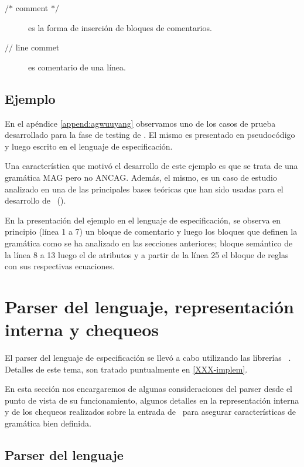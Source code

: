 \begin{description}
\item [$\textbf{/*}$ comment $\textbf{*/}$] es la forma de inserción de bloques de comentarios.
\item [$\textbf{//}$ line commet] es comentario de una línea.
\end{description} 

\subsection{Ejemplo}

En el apéndice \ref{append:agwuuyang} observamos uno de los casos de prueba desarrollado para la fase de testing de \maggen. El mismo es presentado en pseudocódigo y luego escrito en el lenguaje de especificación. 

Una característica que motivó el desarrollo de este ejemplo es que se trata de una gramática MAG pero no ANCAG. Además, el mismo, es un caso de estudio analizado en una de las principales bases teóricas que han sido usadas para el desarrollo de \maggen\ (\cite{wuu-yang1}). 

En la presentación del ejemplo en el lenguaje de especificación, se observa en principio (línea 1 a 7) un bloque de comentario y luego los bloques que definen la gramática como se ha analizado en las secciones anteriores; bloque semántico de la línea 8 a 13 luego el de atributos y a partir de la línea 25 el bloque de reglas con sus respectivas ecuaciones.

 
\section{Parser del lenguaje, representación interna y chequeos}

El parser del lenguaje de especificación se llevó a cabo utilizando las librerías \boost\ \spirit. Detalles de este tema, son tratado puntualmente en \ref{XXX-implem}. 

En esta sección nos encargaremos de algunas consideraciones del parser desde el punto de vista de su funcionamiento, algunos detalles en la representación interna y de los chequeos realizados sobre la entrada de \maggen\ para asegurar características de gramática bien definida.

\subsection*{Parser del lenguaje}

